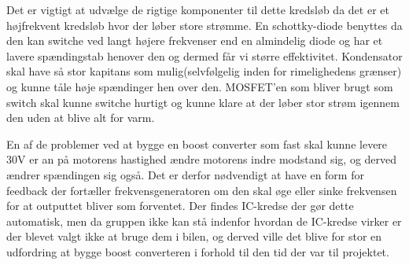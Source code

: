 Det er vigtigt at udvælge de rigtige komponenter til dette kredsløb da det er et højfrekvent kredsløb hvor der løber store strømme. En schottky-diode benyttes da den kan switche ved langt højere frekvenser end en almindelig diode og har et lavere spændingstab henover den og dermed får vi større effektivitet. Kondensator skal have så stor kapitans som mulig(selvfølgelig inden for rimelighedens grænser) og kunne tåle høje spændinger hen over den. MOSFET'en som bliver brugt som switch skal kunne switche hurtigt og kunne klare at der løber stor strøm igennem den uden at blive alt for varm.

En af de problemer ved at bygge en boost converter som fast skal kunne levere 30V er an på motorens hastighed ændre motorens indre modstand sig, og derved ændrer spændingen sig også. Det er derfor nødvendigt at have en form for feedback der fortæller frekvensgeneratoren om den skal øge eller sinke frekvensen for at outputtet bliver som forventet. Der findes IC-kredse der gør dette automatisk, men da gruppen ikke kan stå indenfor hvordan de IC-kredse virker er der blevet valgt ikke at bruge dem i  bilen, og derved ville det blive for stor en udfordring at bygge boost converteren i forhold til den tid der var til projektet.  
